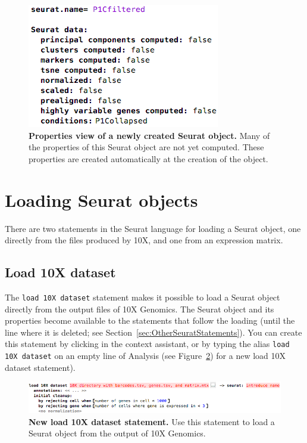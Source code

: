 \begin{figure}
  \centering
  \includegraphics[width=\figWidthSmall]{figures/PropertiesSeurat.png}
    \caption[Properties view of a newly created Seurat object.]
    {\textbf{Properties view of a newly created Seurat object.} Many of the properties
    of this Seurat object are not yet computed. These properties are created automatically
    at the creation of the object.}
\label{fig:PropertiesSeurat}
\end{figure}

\section{Loading Seurat objects}
There are two statements in the Seurat language for loading a Seurat object, one directly
from the files produced by 10X, and one from an expression matrix.

\subsection{Load 10X dataset}\label{subsec:Load10XDataset}
The \texttt{load 10X dataset} statement makes it possible to load a Seurat object directly
from the output files of 10X Genomics. The Seurat object and its properties become available
to the statements that follow the loading (until the line where it is deleted; see
Section~\ref{sec:OtherSeuratStatements}). You can create this statement by clicking
 in the context assistant, or by typing
the alias \texttt{load 10X dataset} on an empty line of Analysis (see Figure~\ref{fig:Load10XDataset})
for a new load 10X dataset statement).

\begin{figure}[h!tbp]
  \centering
  \includegraphics[width=\figWidthWide]{figures/Load10XDataset.png}
    \caption[New load 10X dataset statement.]{\textbf{New load 10X dataset statement.}
    Use this statement to load a Seurat object from the output of 10X Genomics.}
\label{fig:Load10XDataset}
\end{figure}

